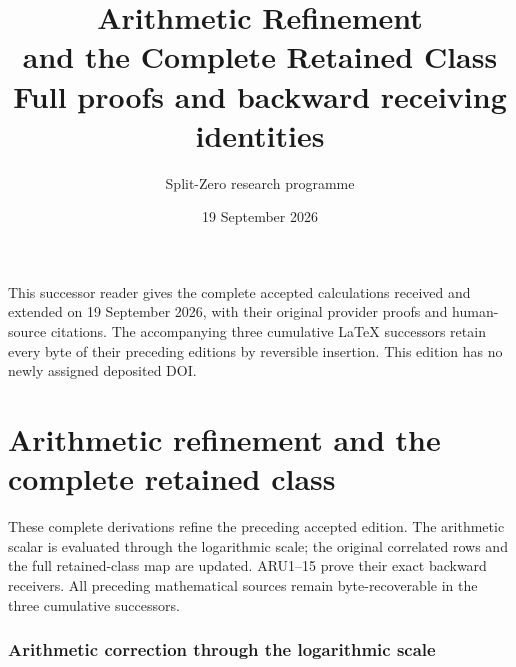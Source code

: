 \documentclass[11pt,a4paper]{article}
\title{Arithmetic Refinement\\and the Complete Retained Class\\[0.6em]\large Full proofs and backward receiving identities}
\author{Split-Zero research programme}
\date{19 September 2026}
\begin{document}
\maketitle
\noindent This successor reader gives the complete accepted calculations received and
extended on 19 September 2026, with their original provider proofs and
human-source citations. The accompanying three cumulative LaTeX successors
retain every byte of their preceding editions by reversible insertion.
This edition has no newly assigned deposited DOI.
\tableofcontents
\begingroup
\clearpage
\part{Arithmetic refinement and the complete retained class}
\noindent These complete derivations refine the preceding accepted edition.
The arithmetic scalar is evaluated through the logarithmic scale; the
original correlated rows and the full retained-class map are updated.
ARU1--15 prove their exact backward receivers. All preceding mathematical
sources remain byte-recoverable in the three cumulative successors.
\providecommand{\tightlist}{\setlength{\itemsep}{0pt}\setlength{\parskip}{0pt}}
\providecommand{\C}{\mathbb C}\providecommand{\R}{\mathbb R}
\providecommand{\Z}{\mathbb Z}\providecommand{\Q}{\mathbb Q}
\providecommand{\N}{\mathbb N}
\providecommand{\im}{\operatorname{im}}
\providecommand{\diag}{\operatorname{diag}}
\providecommand{\Gr}{\operatorname{Gram}}
\providecommand{\Gram}{\operatorname{Gram}}
\providecommand{\Res}{\operatorname{Res}}
\providecommand{\cond}{\operatorname{cond}}
\providecommand{\ExtensionTok}[1]{#1}\providecommand{\NormalTok}[1]{#1}
\providecommand{\StringTok}[1]{#1}\providecommand{\BuiltInTok}[1]{#1}
\providecommand{\ControlFlowTok}[1]{#1}

\clearpage
\begingroup
\def\R{\mathbb R}
\def\C{\mathbb C}
\def\PP{\mathcal P}
\def\BB{\mathcal B}
\def\dd{\,d}
\def\Tr{\operatorname{Tr}}
\def\Gram{\operatorname{Gram}}
\def\rank{\operatorname{rank}}

\setcounter{equation}{0}
\renewcommand{\theequation}{A02SR.\arabic{equation}}
\section*{Arithmetic correction through the logarithmic scale}
\end{document}
